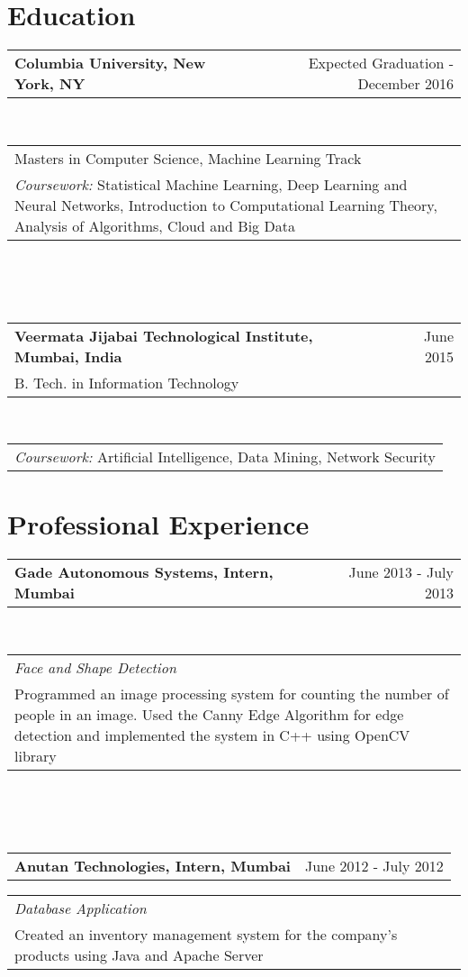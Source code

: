 \documentclass[margin,line]{res}
\begin{document}
\address {sm4083@columbia.edu $\mid$ 929-373-8678 $\mid$ 567 West 125th St. New York NY 10027}
\begin{resume}

\section{\sc\bf Education}
\begin{tabular}{p{3.41in}  r}
\bf Columbia University, New York, NY & Expected Graduation - December 2016
\end{tabular}
\\
\begin{tabular}{p{5.92in}}
Masters in Computer Science, Machine Learning Track\\
\textit{Coursework:} Statistical Machine Learning, Deep Learning and Neural Networks, Introduction to Computational Learning Theory, Analysis of Algorithms, Cloud and Big Data
\end{tabular}
\\\\\\
\begin{tabular}{p{5.136in} r}
\bf Veermata Jijabai Technological Institute, Mumbai, India & June 2015\\
B. Tech. in Information Technology 
\end{tabular}
\\
\begin{tabular}{p{5.92in}}
\textit{Coursework:} Artificial Intelligence, Data Mining, Network Security
\end{tabular}

\section{\sc \bf Professional Experience}
\begin{tabular}{p{4.41in}  r}
\bf Gade Autonomous Systems, Intern, Mumbai  & June 2013 - July 2013
\end{tabular}
\\
\begin{tabular}{p{5.92in}}
\it Face and Shape Detection \\
Programmed an image processing system for counting the number of people in an image. Used the Canny Edge Algorithm for edge detection and implemented the system in C++ using OpenCV library

\end{tabular}
\\\\\\
\begin{tabular}{p{4.4in}  r}
\bf Anutan Technologies, Intern, Mumbai & June 2012 - July 2012
\end{tabular}
\begin{tabular}{p{5.92in}}
\it Database Application \\
Created an inventory management system for the company's products using Java and Apache Server


\end{tabular}
\end{resume}
\end{document}
